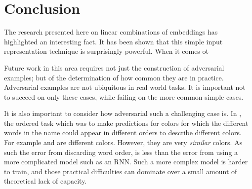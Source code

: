 \documentclass{book}
\begin{document}
	
\chapter{Conclusion}
The research presented here on linear combinations of embeddings has highlighted an interesting fact.
It has been shown that this simple input representation technique is surprisingly powerful.
When it comes ot 


Future work in this area requires not just the construction of adversarial examples; but of the determination of how common they are in practice.
Adversarial examples are not ubiquitous in real world tasks.
It is important not to succeed on only these cases, while failing on the more common simple cases.

It is also important to consider how adversarial such a challenging case is.
In , the ordered task which was to make predictions for colors for which the different words in the name could appear in different orders to describe different colors.
For example  and  are different colors.
However, they are very \emph{similar} colors.
As such the error from discarding word order, is less than the error from using a more complicated model such as an RNN.
Such a more complex model is harder to train, and those practical difficulties can dominate over a small amount of theoretical lack of capacity.
\end{document}
